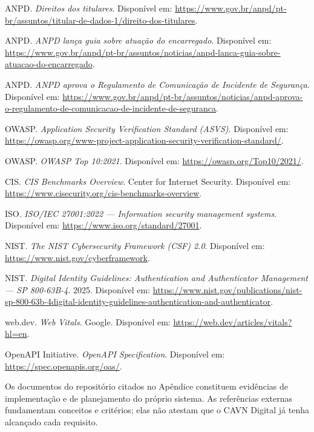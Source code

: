 \documentclass[11pt,a4paper]{article}
\begin{document}
\begin{enumerate}[label={\textbf{[\arabic*]}}]
  \item ANPD. \textit{Direitos dos titulares}. Disponível em: \url{https://www.gov.br/anpd/pt-br/assuntos/titular-de-dados-1/direito-dos-titulares}.
  \item ANPD. \textit{ANPD lança guia sobre atuação do encarregado}. Disponível em: \url{https://www.gov.br/anpd/pt-br/assuntos/noticias/anpd-lanca-guia-sobre-atuacao-do-encarregado}.
  \item ANPD. \textit{ANPD aprova o Regulamento de Comunicação de Incidente de Segurança}. Disponível em: \url{https://www.gov.br/anpd/pt-br/assuntos/noticias/anpd-aprova-o-regulamento-de-comunicacao-de-incidente-de-seguranca}.
  \item OWASP. \textit{Application Security Verification Standard (ASVS)}. Disponível em: \url{https://owasp.org/www-project-application-security-verification-standard/}.
  \item OWASP. \textit{OWASP Top 10:2021}. Disponível em: \url{https://owasp.org/Top10/2021/}.
  \item CIS. \textit{CIS Benchmarks Overview}. Center for Internet Security. Disponível em: \url{https://www.cisecurity.org/cis-benchmarks-overview}.
  \item ISO. \textit{ISO/IEC 27001:2022 — Information security management systems}. Disponível em: \url{https://www.iso.org/standard/27001}.
  \item NIST. \textit{The NIST Cybersecurity Framework (CSF) 2.0}. Disponível em: \url{https://www.nist.gov/cyberframework}.
  \item NIST. \textit{Digital Identity Guidelines: Authentication and Authenticator Management — SP 800-63B-4}. 2025. Disponível em: \url{https://www.nist.gov/publications/nist-sp-800-63b-4digital-identity-guidelines-authentication-and-authenticator}.
  \item web.dev. \textit{Web Vitals}. Google. Disponível em: \url{https://web.dev/articles/vitals?hl=en}.
  \item OpenAPI Initiative. \textit{OpenAPI Specification}. Disponível em: \url{https://spec.openapis.org/oas/}.
\end{enumerate}

\begin{quotebox}[title=Observação sobre referências internas]
Os documentos do repositório citados no Apêndice constituem evidências de implementação e de planejamento do próprio sistema. As referências externas fundamentam conceitos e critérios; elas não atestam que o CAVN Digital já tenha alcançado cada requisito.
\end{quotebox}
\end{document}
